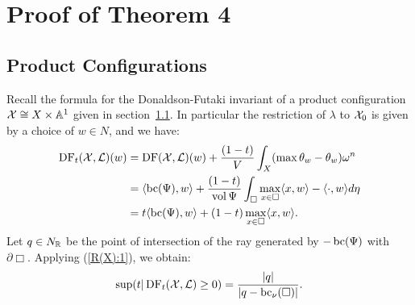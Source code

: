 \section{Proof of Theorem 4}
\subsection{Product Configurations}
Recall the formula for the Donaldson-Futaki invariant of a product configuration \({\mathcal{X}} \cong X \times \mathbb{A}^1\) given in section~\ref{}. In particular the restriction of \(\lambda\) to \({\mathcal{X}}_0\) is given by a choice of \(w \in N\), and we have:
\begin{align*}
\mathop{\rm DF}\nolimits_t({\mathcal{X}},\mathcal{L})(w) &=   \mathop{\rm DF}\nolimits({\mathcal{X}},\mathcal{L})(w) + \frac{(1-t)}{V} \int_{X} (\max \theta_w - \theta_w) \omega^n \\ &= \langle  \mathop{\rm bc}\nolimits(\Psi), w \rangle + \frac{(1-t)}{\mathop{\rm vol}\nolimits \Psi} \int_\Box \max_{x \in \Box} \langle x,w \rangle  - \langle \cdot, w \rangle d \eta \\
&= t \langle  \mathop{\rm bc}\nolimits(\Psi), w \rangle + (1-t)\max_{x \in \Box} \langle x,w \rangle.
\end{align*}
Let \(q \in N_{\mathbb{R}}\) be the point of intersection of the ray generated by \(-\mathop{\rm bc}\nolimits(\Psi)\) with \(\partial \Box\). Applying (\ref{R(X):1}), we obtain:
\[
\sup(t | \mathop{\rm DF}\nolimits_t({\mathcal{X}},\mathcal{L}) \ge 0) = \frac{|q|}{|q-\mathop{\rm bc}\nolimits_\nu(\Box)|}.
\]
